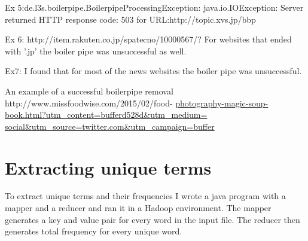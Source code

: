 \documentclass[12pt]{article} %
\begin{document}
Ex 5:de.l3s.boilerpipe.BoilerpipeProcessingException: java.io.IOException: Server returned HTTP response code: 503 for URL:http://topic.xvs.jp/bbp

Ex 6: http://item.rakuten.co.jp/spatecno/10000567/?
For websites that ended with '.jp' the boiler pipe was unsuccessful as well.

Ex7: I found that for most of the news websites the boiler pipe was unsuccessful.

An example of a successful boilerpipe removal
http://www.missfoodwise.com/2015/02/food-
\url{photography-magic-soup-book.html?utm_content=bufferd528d&utm_medium=
social&utm_source=twitter.com&utm_campaign=buffer}











\section{Extracting unique terms}

To extract unique terms and their frequencies I wrote a java program with a mapper and a reducer and ran it in a Hadoop environment. The mapper generates a key and value pair for every word in the input file. The reducer then generates total frequency for every unique word.\cite{hadoop}
\end{document}
